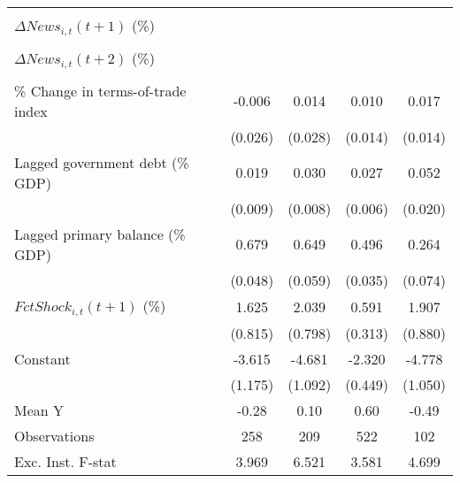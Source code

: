 {\begin{tabular}{l*{4}{c}}
                    &                     &                     &                     &                     \\
\addlinespace
$ \Delta News_{i,t}(t+1)$ (\%)&                     &                     &                     &                     \\
                    &                     &                     &                     &                     \\
\addlinespace
$ \Delta News_{i,t}(t+2)$ (\%)&                     &                     &                     &                     \\
                    &                     &                     &                     &                     \\
\addlinespace
\% Change in terms-of-trade index&      -0.006         &       0.014         &       0.010         &       0.017         \\
                    &     (0.026)         &     (0.028)         &     (0.014)         &     (0.014)         \\
\addlinespace
Lagged government debt (\% GDP)&       0.019\sym{**} &       0.030\sym{***}&       0.027\sym{***}&       0.052\sym{**} \\
                    &     (0.009)         &     (0.008)         &     (0.006)         &     (0.020)         \\
\addlinespace
Lagged primary balance (\% GDP)&       0.679\sym{***}&       0.649\sym{***}&       0.496\sym{***}&       0.264\sym{***}\\
                    &     (0.048)         &     (0.059)         &     (0.035)         &     (0.074)         \\
\addlinespace
$ FctShock_{i,t}(t+1)$ (\%)&       1.625\sym{*}  &       2.039\sym{**} &       0.591\sym{*}  &       1.907\sym{**} \\
                    &     (0.815)         &     (0.798)         &     (0.313)         &     (0.880)         \\
\addlinespace
Constant            &      -3.615\sym{***}&      -4.681\sym{***}&      -2.320\sym{***}&      -4.778\sym{***}\\
                    &     (1.175)         &     (1.092)         &     (0.449)         &     (1.050)         \\
\midrule
Mean Y              &       -0.28         &        0.10         &        0.60         &       -0.49         \\
Observations        &         258         &         209         &         522         &         102         \\
Exc. Inst. F-stat   &       3.969         &       6.521         &       3.581         &       4.699         \\
\bottomrule
\end{tabular}
}
